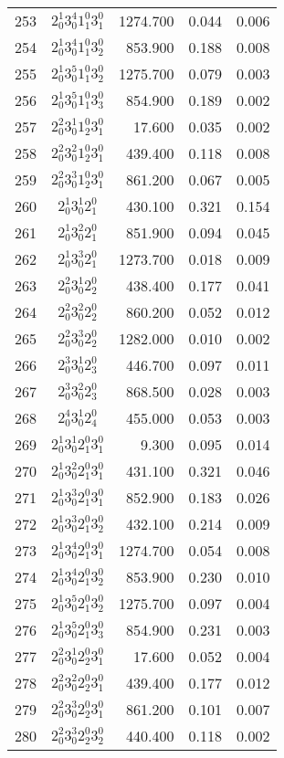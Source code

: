 \documentclass{revtex4}
\begin{document}
\begin{table}
\begin{tabular}{rcrrr}
253&$2_0^1 3_0^4 1_1^0 3_1^0$& 1274.700& 0.044& 0.006\\
254&$2_0^1 3_0^4 1_1^0 3_2^0$& 853.900& 0.188& 0.008\\
255&$2_0^1 3_0^5 1_1^0 3_2^0$& 1275.700& 0.079& 0.003\\
256&$2_0^1 3_0^5 1_1^0 3_3^0$& 854.900& 0.189& 0.002\\
257&$2_0^2 3_0^1 1_2^0 3_1^0$& 17.600& 0.035& 0.002\\
258&$2_0^2 3_0^2 1_2^0 3_1^0$& 439.400& 0.118& 0.008\\
259&$2_0^2 3_0^3 1_2^0 3_1^0$& 861.200& 0.067& 0.005\\
260&$2_0^1 3_0^1 2_1^0$& 430.100& 0.321& 0.154\\
261&$2_0^1 3_0^2 2_1^0$& 851.900& 0.094& 0.045\\
262&$2_0^1 3_0^3 2_1^0$& 1273.700& 0.018& 0.009\\
263&$2_0^2 3_0^1 2_2^0$& 438.400& 0.177& 0.041\\
264&$2_0^2 3_0^2 2_2^0$& 860.200& 0.052& 0.012\\
265&$2_0^2 3_0^3 2_2^0$& 1282.000& 0.010& 0.002\\
266&$2_0^3 3_0^1 2_3^0$& 446.700& 0.097& 0.011\\
267&$2_0^3 3_0^2 2_3^0$& 868.500& 0.028& 0.003\\
268&$2_0^4 3_0^1 2_4^0$& 455.000& 0.053& 0.003\\
269&$2_0^1 3_0^1 2_1^0 3_1^0$& 9.300& 0.095& 0.014\\
270&$2_0^1 3_0^2 2_1^0 3_1^0$& 431.100& 0.321& 0.046\\
271&$2_0^1 3_0^3 2_1^0 3_1^0$& 852.900& 0.183& 0.026\\
272&$2_0^1 3_0^3 2_1^0 3_2^0$& 432.100& 0.214& 0.009\\
273&$2_0^1 3_0^4 2_1^0 3_1^0$& 1274.700& 0.054& 0.008\\
274&$2_0^1 3_0^4 2_1^0 3_2^0$& 853.900& 0.230& 0.010\\
275&$2_0^1 3_0^5 2_1^0 3_2^0$& 1275.700& 0.097& 0.004\\
276&$2_0^1 3_0^5 2_1^0 3_3^0$& 854.900& 0.231& 0.003\\
277&$2_0^2 3_0^1 2_2^0 3_1^0$& 17.600& 0.052& 0.004\\
278&$2_0^2 3_0^2 2_2^0 3_1^0$& 439.400& 0.177& 0.012\\
279&$2_0^2 3_0^3 2_2^0 3_1^0$& 861.200& 0.101& 0.007\\
280&$2_0^2 3_0^3 2_2^0 3_2^0$& 440.400& 0.118& 0.002\\

\end{tabular}
\end{table}
\end{document}
